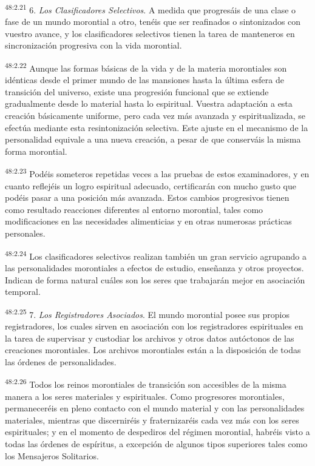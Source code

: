 \par
\textsuperscript{48:2.21} 6. \textit{Los Clasificadores Selectivos}. A medida que progresáis de una clase o fase de un mundo morontial a otro, tenéis que ser reafinados o sintonizados con vuestro avance, y los clasificadores selectivos tienen la tarea de manteneros en sincronización progresiva con la vida morontial.

\par
\textsuperscript{48:2.22} Aunque las formas básicas de la vida y de la materia morontiales son idénticas desde el primer mundo de las mansiones hasta la última esfera de transición del universo, existe una progresión funcional que se extiende gradualmente desde lo material hasta lo espiritual. Vuestra adaptación a esta creación básicamente uniforme, pero cada vez más avanzada y espiritualizada, se efectúa mediante esta resintonización selectiva. Este ajuste en el mecanismo de la personalidad equivale a una nueva creación, a pesar de que conserváis la misma forma morontial.

\par
\textsuperscript{48:2.23} Podéis someteros repetidas veces a las pruebas de estos examinadores, y en cuanto reflejéis un logro espiritual adecuado, certificarán con mucho gusto que podéis pasar a una posición más avanzada. Estos cambios progresivos tienen como resultado reacciones diferentes al entorno morontial, tales como modificaciones en las necesidades alimenticias y en otras numerosas prácticas personales.

\par
\textsuperscript{48:2.24} Los clasificadores selectivos realizan también un gran servicio agrupando a las personalidades morontiales a efectos de estudio, enseñanza y otros proyectos. Indican de forma natural cuáles son los seres que trabajarán mejor en asociación temporal.

\par
\textsuperscript{48:2.25} 7. \textit{Los Registradores Asociados}. El mundo morontial posee sus propios registradores, los cuales sirven en asociación con los registradores espirituales en la tarea de supervisar y custodiar los archivos y otros datos autóctonos de las creaciones morontiales. Los archivos morontiales están a la disposición de todas las órdenes de personalidades.

\par
\textsuperscript{48:2.26} Todos los reinos morontiales de transición son accesibles de la misma manera a los seres materiales y espirituales. Como progresores morontiales, permaneceréis en pleno contacto con el mundo material y con las personalidades materiales, mientras que discerniréis y fraternizaréis cada vez más con los seres espirituales; y en el momento de despediros del régimen morontial, habréis visto a todas las órdenes de espíritus, a excepción de algunos tipos superiores tales como los Mensajeros Solitarios.


